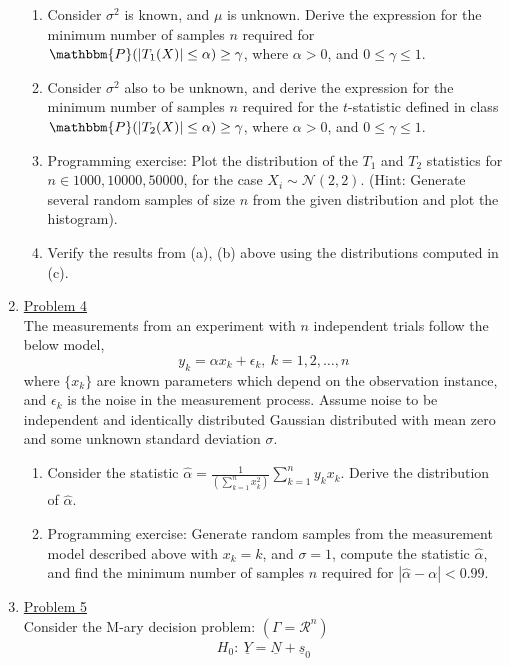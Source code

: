 \documentclass[a4paper,english,12pt]{article}
\newcommand{\ubar}[1]{\underline{#1}}
\begin{document}
\begin{enumerate}
\begin{enumerate}
\item Consider $\sigma^2$ is known, and $\mu$ is unknown. Derive the expression for the minimum number of samples $n$ required for $\mathbbm{P}(|T_1(X)|\leq\alpha)\geq \gamma$, where $\alpha>0$, and $0\leq \gamma \leq 1$.
\item Consider $\sigma^2$ also to be unknown, and derive the expression for the minimum number of samples $n$ required for the $t$-statistic defined in class $\mathbbm{P}(|T_2(X)|\leq\alpha)\geq \gamma$, where $\alpha>0$, and $0\leq \gamma \leq 1$.
\item Programming exercise: Plot the distribution of the $T_1$ and $T_2$ statistics for $n\in {1000,10000,50000}$, for the case  $X_i\sim \mathcal{N}(2,2)$. (Hint: Generate several random samples of size $n$ from the given distribution and plot the histogram).
\item Verify the results from (a), (b) above using the distributions computed in (c).
\end{enumerate} 
\item \hyperlink{solution4}{Problem 4}\\
The measurements from an experiment with $n$ independent trials follow the below model,
\begin{equation*}
y_k=\alpha x_k + \epsilon_k,~k=1,2,\dots,n
\end{equation*}
where $\{x_k\}$ are known parameters which depend on the observation instance, and $\epsilon_k$ is the noise in the measurement process. Assume noise to be independent and identically distributed Gaussian distributed with mean zero and some unknown standard deviation $\sigma$. 
\begin{enumerate}
\item Consider the statistic ${\hat \alpha}=\frac{1}{\left(\sum\limits_{k=1}^{n} x_k^2\right)}\sum\limits_{k=1}^{n} y_kx_k$. Derive the distribution of ${\hat \alpha}$. 
\item Programming exercise: Generate random samples from the measurement model described above with $x_k=k$, and $\sigma=1$, compute the statistic ${\hat \alpha}$, and find the minimum number of samples $n$ required for $|{\hat \alpha}-\alpha|<0.99$.
\end{enumerate}
\item \hyperlink{solution5}{Problem 5}\\
Consider the M-ary decision problem: $(\Gamma=\mathcal{R}^n)$
\begin{eqnarray*}
H_0:~\ubar{Y}=\ubar{N}+\ubar{s}_0\\

\end{eqnarray*}
\end{enumerate}
\end{document}
